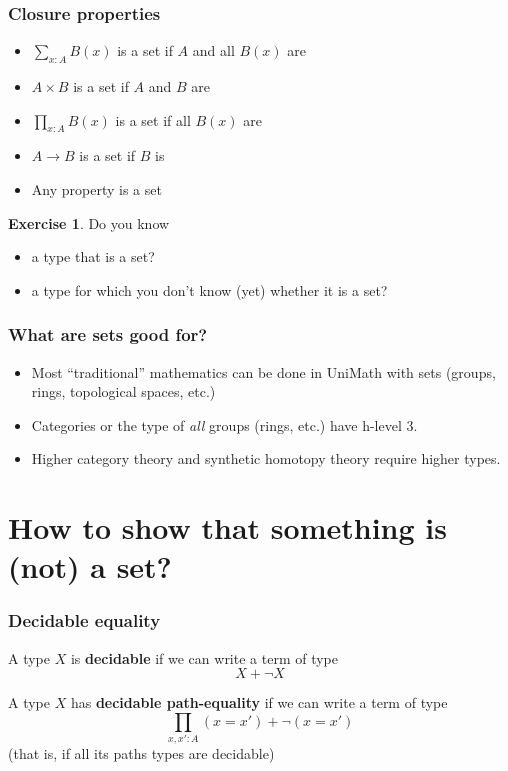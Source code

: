 \documentclass{beamer}
\newcommand{\fat}[1]{\textbf{#1}}
\theoremstyle{definition}
\newtheorem{exercise}{Exercise}
\begin{document}
\begin{frame}
 \frametitle{Closure properties}

   \begin{itemize}
    \item $\sum_{x:A}B(x)$ is a set if $A$ and all $B(x)$ are
    \item $A \times B$ is a set if $A$ and $B$ are
    \item $\prod_{x:A}B(x)$ is a set if all $B(x)$ are
    \item $A \to B$ is a set if $B$ is
   \end{itemize}

   \begin{itemize}
    \item Any property is a set
   \end{itemize}
   \pause
   \begin{exercise}
          Do you know

     \begin{itemize}
      \item a type that is a set?
      \item a type for which you don't know (yet) whether it is a set?
     \end{itemize}

   \end{exercise}

\end{frame}

\begin{frame}
  \frametitle{What are sets good for?}

  \begin{itemize}
  \item Most ``traditional'' mathematics can be done in UniMath with sets (groups, rings, topological spaces, etc.) \pause
  \item Categories or the type of \emph{all} groups (rings, etc.) have h-level 3. \pause
  \item Higher category theory and synthetic homotopy theory require higher types.
  \end{itemize}
\end{frame}



\section{How to show that something is (not) a set?}

\begin{frame}
 \frametitle{Decidable equality}

    \begin{definition}
     A type $X$ is \fat{decidable} if we can write a term of type
     \[     X + \neg X \]
    \end{definition}

    \begin{definition}
     A type $X$ has \fat{decidable path-equality} if we can write a term of type
     \[  \prod_{x, x' : A} (x = x') + \neg(x=x') \]
     (that is, if all its paths types are decidable)
    \end{definition}

\end{frame}
\end{document}
